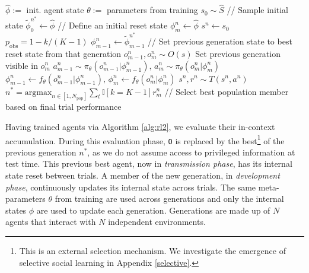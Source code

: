 \documentclass{article}
\begin{document}
\begin{algorithm}[H]
\caption{In-Context Accumulation During Evaluation}\label{alg:ica}
\begin{algorithmic}[1]
\STATE $\hat{\phi} :=$ init. agent state 
\STATE $\theta :=$ parameters from training
\STATE $s_0 \sim \hat{S}$ // Sample initial state
\STATE $\tilde{\phi}^{n^*}_0 \gets \hat{\phi}$ // Define an initial reset state 
\STATE $\phi^n_m \gets \hat{\phi}$
\STATE $s^n \leftarrow s_0$
\ENDIF
\STATE $p_{\text{obs}} = 1 - k/(K-1)$
\STATE $\phi^n_{m-1} \gets \tilde{\phi}^{n^*}_{m-1}$ // Set previous generation state to best reset state from that generation
{}
\STATE $o^{n}_{m-1}, o^{n}_m \sim O(s)$
\STATE Set previous generation visible in $o^n_m$
\ENDIF
\STATE $a^n_{m-1} \sim \pi_\theta(o^n_{m-1} | \phi^n_{m-1}), \, a^n_m \sim \pi_\theta(o^n_m | \phi^n_m)$
\STATE $\phi^n_{m-1} \gets f_\theta(o^n_{m-1} | \phi^n_{m-1}), \, \phi^n_m \gets f_\theta(o^n_m | \phi^n_m)$
\STATE $s^n, r^n \sim T(s^n, a^n)$
\ENDWHILE
\ENDFOR
\STATE $n^{*} = \text{argmax}_{n \in [1, N_\text{pop}]} \sum_t \mathbb{I}[k = K - 1] r^n_m$ // Select best population member based on final trial performance
\ENDFOR
\ENDFOR
\end{algorithmic}
\end{algorithm}

Having trained agents via Algorithm \ref{alg:rl2}, we evaluate their in-context accumulation. During this evaluation phase, \texttt{O} is replaced by the best\footnote{This is an external selection mechanism. We investigate the emergence of selective social learning in Appendix \ref{selective}.} of the previous generation $n^*$, as we do not assume access to privileged information at test time. This previous best agent, now in \textit{transmission phase}, has its internal state reset between trials. A member of the new generation, in \textit{development phase}, continuously updates its internal state across trials. The same meta-parameters $\theta$ from training are used across generations and only the internal states $\phi$ are used to update each generation. Generations are made up of $N$ agents that interact with $N$ independent environments.
\end{document}
